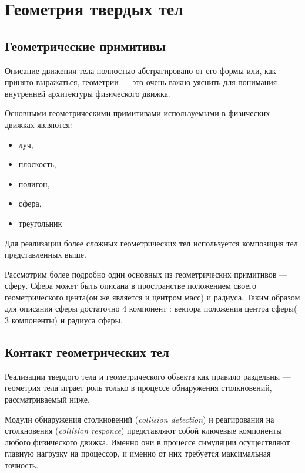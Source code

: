 \chapter{Геометрия твердых тел}
\section{Геометрические примитивы}
Описание движения тела полностью абстрагировано от его формы
или, как принято выражаться, геометрии --- это очень важно
уяснить для понимания внутренней архитектуры физического
движка.

Основными геометрическими примитивами используемыми в физических движках являются:
\begin{itemize}
 \item  луч, 
 \item  плоскость,
 \item  полигон,
 \item  сфера,
 \item  треугольник
 \end{itemize}
Для реализации более сложных геометрических тел используется композиция тел представленных выше.

Рассмотрим более подробно один основных из геометрических примитивов --- сферу.
Сфера может быть описана в пространстве положением своего геометрического цента(он же является и центром масс)
и радиуса. Таким образом для описания сферы достаточно 4 компонент : вектора положения центра сферы( 3 компоненты) и радиуса сферы.


\section{Контакт геометрических тел}
Реализации твердого тела и геометрического объекта как правило раздельны --- геометрия тела играет роль только в
процессе обнаружения столкновений, рассматриваемый ниже.

Модули обнаружения столкновений (\textit{collision detection}) и реагирования на столкновения (\textit{collision responce}) представляют 
собой ключевые компоненты любого физического движка. Именно они в процессе симуляции осуществляют главную нагрузку на
процессор, и именно от них требуется максимальная точность.

